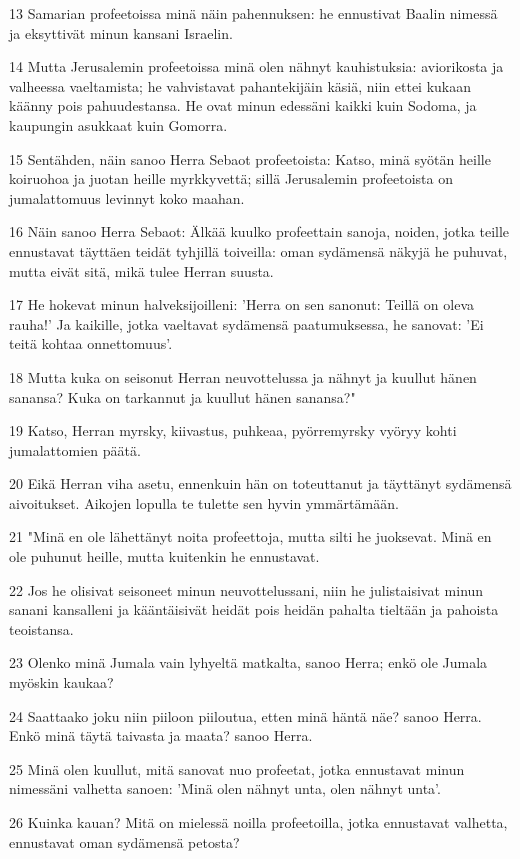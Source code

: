 \par 13 Samarian profeetoissa minä näin pahennuksen: he ennustivat Baalin nimessä ja eksyttivät minun kansani Israelin.
\par 14 Mutta Jerusalemin profeetoissa minä olen nähnyt kauhistuksia: aviorikosta ja valheessa vaeltamista; he vahvistavat pahantekijäin käsiä, niin ettei kukaan käänny pois pahuudestansa. He ovat minun edessäni kaikki kuin Sodoma, ja kaupungin asukkaat kuin Gomorra.
\par 15 Sentähden, näin sanoo Herra Sebaot profeetoista: Katso, minä syötän heille koiruohoa ja juotan heille myrkkyvettä; sillä Jerusalemin profeetoista on jumalattomuus levinnyt koko maahan.
\par 16 Näin sanoo Herra Sebaot: Älkää kuulko profeettain sanoja, noiden, jotka teille ennustavat täyttäen teidät tyhjillä toiveilla: oman sydämensä näkyjä he puhuvat, mutta eivät sitä, mikä tulee Herran suusta.
\par 17 He hokevat minun halveksijoilleni: 'Herra on sen sanonut: Teillä on oleva rauha!' Ja kaikille, jotka vaeltavat sydämensä paatumuksessa, he sanovat: 'Ei teitä kohtaa onnettomuus'.
\par 18 Mutta kuka on seisonut Herran neuvottelussa ja nähnyt ja kuullut hänen sanansa? Kuka on tarkannut ja kuullut hänen sanansa?"
\par 19 Katso, Herran myrsky, kiivastus, puhkeaa, pyörremyrsky vyöryy kohti jumalattomien päätä.
\par 20 Eikä Herran viha asetu, ennenkuin hän on toteuttanut ja täyttänyt sydämensä aivoitukset. Aikojen lopulla te tulette sen hyvin ymmärtämään.
\par 21 "Minä en ole lähettänyt noita profeettoja, mutta silti he juoksevat. Minä en ole puhunut heille, mutta kuitenkin he ennustavat.
\par 22 Jos he olisivat seisoneet minun neuvottelussani, niin he julistaisivat minun sanani kansalleni ja kääntäisivät heidät pois heidän pahalta tieltään ja pahoista teoistansa.
\par 23 Olenko minä Jumala vain lyhyeltä matkalta, sanoo Herra; enkö ole Jumala myöskin kaukaa?
\par 24 Saattaako joku niin piiloon piiloutua, etten minä häntä näe? sanoo Herra. Enkö minä täytä taivasta ja maata? sanoo Herra.
\par 25 Minä olen kuullut, mitä sanovat nuo profeetat, jotka ennustavat minun nimessäni valhetta sanoen: 'Minä olen nähnyt unta, olen nähnyt unta'.
\par 26 Kuinka kauan? Mitä on mielessä noilla profeetoilla, jotka ennustavat valhetta, ennustavat oman sydämensä petosta?

